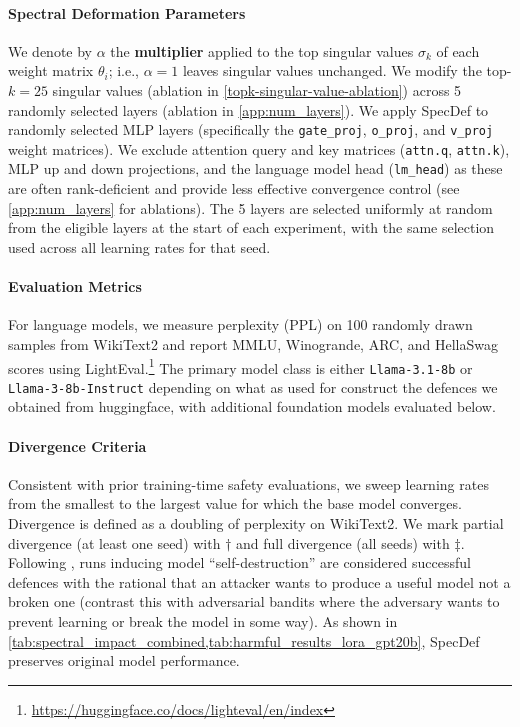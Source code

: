 \documentclass{article}
\theoremstyle{plain}
\theoremstyle{definition}
\theoremstyle{remark}
\begin{document}
\paragraph{Spectral Deformation Parameters} We denote by $\alpha$ the \textbf{multiplier} applied to the top singular values $\sigma_k$ of each weight matrix $\theta_i$; i.e., $\alpha = 1$ leaves singular values unchanged. We modify the top-$k = 25$ singular values (ablation in \cref{topk-singular-value-ablation}) across 5 randomly selected layers (ablation in \cref{app:num_layers}). We apply SpecDef to randomly selected MLP layers (specifically the \texttt{gate\_proj}, \texttt{o\_proj}, and \texttt{v\_proj} weight matrices). We exclude attention query and key matrices (\texttt{attn.q}, \texttt{attn.k}), MLP up and down projections, and the language model head (\texttt{lm\_head}) as these are often rank-deficient and provide less effective convergence control (see \cref{app:num_layers} for ablations). The 5 layers are selected uniformly at random from the eligible layers at the start of each experiment, with the same selection used across all learning rates for that seed.

\paragraph{Evaluation Metrics} For language models, we measure perplexity (PPL) on 100 randomly drawn samples from WikiText2 \citep{merity2016pointer} and report MMLU, Winogrande, ARC, and HellaSwag scores using LightEval.\footnote{\url{https://huggingface.co/docs/lighteval/en/index}} The primary model class is either \texttt{Llama-3.1-8b} or \texttt{Llama-3-8b-Instruct} depending on what as used for construct the defences we obtained from huggingface, with additional foundation models evaluated below.

\paragraph{Divergence Criteria} Consistent with prior training-time safety evaluations, we sweep learning rates from the smallest to the largest value for which the base model converges. Divergence is defined as a doubling of perplexity on WikiText2. We mark partial divergence (at least one seed) with $\dagger$ and full divergence (all seeds) with $\ddagger$. Following \citet{henderson2023self}, runs inducing model ``self-destruction'' are considered successful defences with the rational that an attacker wants to produce a useful model not a broken one (contrast this with adversarial bandits \citep{lattimore2020bandit} where the adversary wants to prevent learning or break the model in some way). As shown in \cref{tab:spectral_impact_combined,tab:harmful_results_lora_gpt20b}, SpecDef preserves original model performance.
\end{document}
